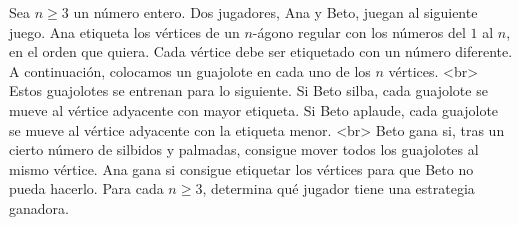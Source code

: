 Sea $n\ge 3$ un número entero. Dos jugadores, Ana y Beto, juegan al siguiente juego. Ana etiqueta los vértices de un $n$-ágono regular con los números del $1$ al $n$, en el orden que quiera. Cada vértice debe ser etiquetado con un número diferente. A continuación, colocamos un guajolote en cada uno de los $n$ vértices. <br>
Estos guajolotes se entrenan para lo siguiente. Si Beto silba, cada guajolote se mueve al vértice adyacente con mayor etiqueta. Si Beto aplaude, cada guajolote se mueve al vértice adyacente con la etiqueta menor. <br>
Beto gana si, tras un cierto número de silbidos y palmadas, consigue mover todos los guajolotes al mismo vértice. Ana gana si consigue etiquetar los vértices para que Beto no pueda hacerlo. Para cada $n\ge 3$, determina qué jugador tiene una estrategia ganadora.
